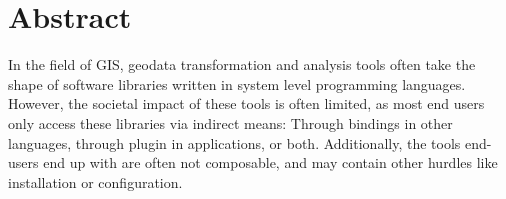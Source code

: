 \chapter*{Abstract}

In the field of \ac{GIS}, geodata transformation and analysis tools often take the shape of software libraries written in system level programming languages.
However, the societal impact of these tools is often limited, as most end users only access these libraries via indirect means: Through bindings in other languages, through plugin in applications, or both. 
Additionally, the tools end-users end up with are often not composable, and may contain other hurdles like installation or configuration. 

